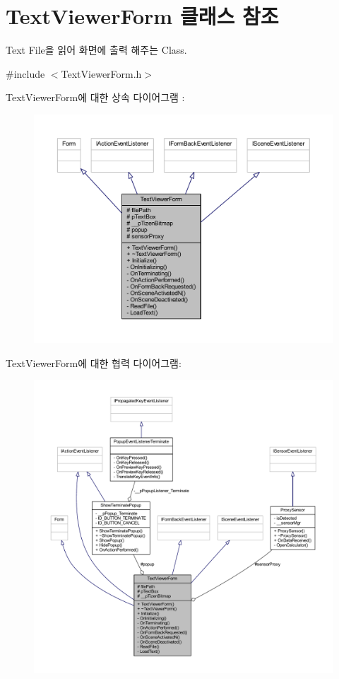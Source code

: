 \hypertarget{class_text_viewer_form}{\section{Text\+Viewer\+Form 클래스 참조}
\label{class_text_viewer_form}
}


Text File을 읽어 화면에 출력 해주는 Class.  




{\ttfamily \#include $<$Text\+Viewer\+Form.\+h$>$}



Text\+Viewer\+Form에 대한 상속 다이어그램 \+: 
\nopagebreak
\begin{figure}[H]
\begin{center}
\leavevmode
\includegraphics[width=350pt]{class_text_viewer_form__inherit__graph}
\end{center}
\end{figure}


Text\+Viewer\+Form에 대한 협력 다이어그램\+:
\nopagebreak
\begin{figure}[H]
\begin{center}
\leavevmode
\includegraphics[width=350pt]{class_text_viewer_form__coll__graph}
\end{center}
\end{figure}
